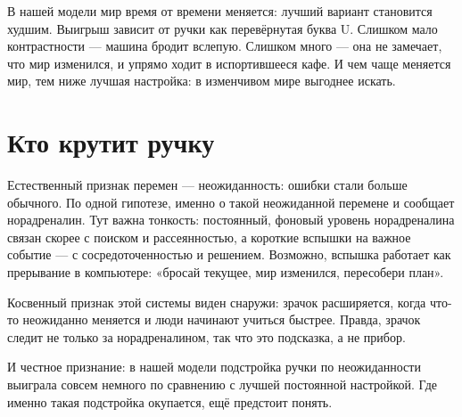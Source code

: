 В нашей модели мир время от времени меняется: лучший вариант становится худшим. Выигрыш зависит от ручки как перевёрнутая буква U. Слишком мало контрастности --- машина бродит вслепую. Слишком много --- она не замечает, что мир изменился, и упрямо ходит в испортившееся кафе. И чем чаще меняется мир, тем ниже лучшая настройка: в изменчивом мире выгоднее искать.


\section*{Кто крутит ручку}

Естественный признак перемен --- неожиданность: ошибки стали больше обычного. По одной гипотезе, именно о такой неожиданной перемене и сообщает норадреналин. Тут важна тонкость: постоянный, фоновый уровень норадреналина связан скорее с поиском и рассеянностью, а короткие вспышки на важное событие --- с сосредоточенностью и решением. Возможно, вспышка работает как прерывание в компьютере: «бросай текущее, мир изменился, пересобери план».

Косвенный признак этой системы виден снаружи: зрачок расширяется, когда что-то неожиданно меняется и люди начинают учиться быстрее. Правда, зрачок следит не только за норадреналином, так что это подсказка, а не прибор.

И честное признание: в нашей модели подстройка ручки по неожиданности выиграла совсем немного по сравнению с лучшей постоянной настройкой. Где именно такая подстройка окупается, ещё предстоит понять.

